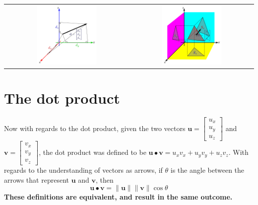 \documentclass{article}
\begin{document}
\begin{tabular}{cc}
\parbox{0.5\textwidth}{\includegraphics[width = 0.5\textwidth]{displacement_vector_components}} & 
\parbox{0.5\textwidth}{\includegraphics[width = 0.5\textwidth]{surface_vector_components}}
\end{tabular}



\section*{The dot product}

Now with regards to the dot product, given the two vectors \(\mathbf{u} = \begin{bmatrix} u_x \\ u_y \\ u_z \end{bmatrix}\) and \(\mathbf{v} = \begin{bmatrix} v_x \\ v_y \\ v_z \end{bmatrix}\), the dot product was defined to be \(\mathbf{u} \bullet \mathbf{v} = u_x v_x + u_y v_y + u_z v_z\). With regards to the understanding of vectors as arrows, if \(\theta\) is the angle between the arrows that represent \(\mathbf{u}\) and \(\mathbf{v}\), then 
\[\mathbf{u} \bullet \mathbf{v} = \|\mathbf{u}\|\|\mathbf{v}\|\cos\theta\]
{\bf These definitions are equivalent, and result in the same outcome.}
\end{document}
